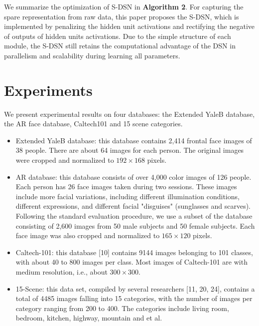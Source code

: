 \documentclass[letterpaper]{article}
\begin{document}
We summarize the optimization of S-DSN in \textbf{Algorithm 2}.
For capturing the spare representation from raw data, this paper proposes the S-DSN, which is implemented by penalizing the hidden unit activations and rectifying the negative of outputs of hidden units activations. Due to the simple structure of each module, the S-DSN still retains the computational advantage of the DSN in parallelism and scalability during learning all parameters.

\section{Experiments}
\label{sec:experiment}
We present experimental results on four databases: the Extended YaleB database, the AR face database, Caltech101 and 15 scene categories.
\begin{itemize}
  \item Extended YaleB database: this database contains 2,414 frontal face images of 38 people. There are about 64 images for each person. The original images were cropped and normalized to $192\times 168$ pixels.
  \item AR database: this database consists of over 4,000 color images of 126 people. Each person has 26 face images taken during two sessions. These images include more facial variations, including different illumination conditions, different expressions, and different facial "disguises" (sunglasses and scarves). Following the standard evaluation procedure, we use a subset of the database consisting of 2,600 images from 50 male subjects and 50 female subjects. Each face image was also cropped and normalized to $165\times 120$ pixels.
  \item Caltech-101: this database [10] contains 9144 images belonging to 101 classes, with about 40 to 800 images per class. Most images of Caltech-101 are with medium resolution, i.e., about $300\times300$.
  \item 15-Scene: this data set, compiled by several researchers [11, 20, 24], contains a total of 4485 images falling into 15 categories, with the number of images per category ranging from 200 to 400. The categories include living room, bedroom, kitchen, highway, mountain and et al.
\end{itemize}
\end{document}

